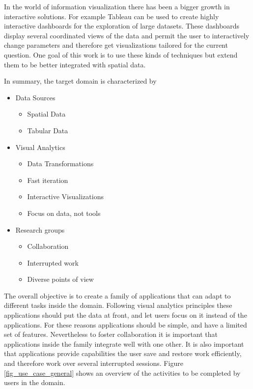 In the world of information visualization there has been a bigger growth in interactive solutions. For example Tableau \autocite{hanrahan_tableau_2003} can be used to create highly interactive dashboards for the exploration of large datasets. These dashboards display several coordinated views of the data and permit the user to interactively change parameters and therefore get visualizations tailored for the current question. One goal of this work is to use these kinds of techniques but extend them to be better integrated with spatial data. 



\bigskip

In summary, the target domain is characterized by
\begin{itemize}
\item Data Sources
\begin{itemize}
\item Spatial Data
\item Tabular Data
\end{itemize}
\item Visual Analytics
\begin{itemize}
\item Data Transformations
\item Fast iteration
\item Interactive Visualizations
\item Focus on data, not tools
\end{itemize}
\item Research groups
\begin{itemize}
\item Collaboration
\item Interrupted work
\item Diverse points of view
\end{itemize}
\end{itemize}

The overall objective is to create a family of applications that can adapt to different tasks inside the domain. Following visual analytics principles these applications should put the data at front, and let users focus on it instead of the applications. For these reasons applications should be simple, and have a limited set of features. Nevertheless to foster collaboration it is important that applications inside the family integrate well with one other. It is also important that applications provide capabilities the user save and restore work efficiently, and therefore work over several interrupted sessions. Figure \ref{fig_use_case_general} shows an overview of the activities to be completed by users in the domain.

